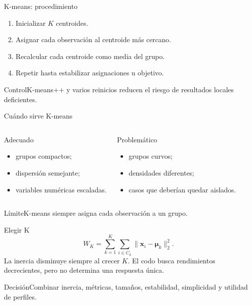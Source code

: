 \documentclass[aspectratio=169,10pt]{beamer}
\begin{document}
\begin{frame}{K-means: procedimiento}\small
\begin{enumerate}\item Inicializar $K$ centroides.\item Asignar cada observación al centroide más cercano.\item Recalcular cada centroide como media del grupo.\item Repetir hasta estabilizar asignaciones u objetivo.\end{enumerate}
\begin{block}{Control}K-means++ y varios reinicios reducen el riesgo de resultados locales deficientes.\end{block}
\end{frame}

\begin{frame}{Cuándo sirve K-means}\small
\begin{columns}[T]\begin{block}{Adecuado}\begin{itemize}\item grupos compactos;\item dispersión semejante;\item variables numéricas escaladas.\end{itemize}\end{block}\begin{alertblock}{Problemático}\begin{itemize}\item grupos curvos;\item densidades diferentes;\item casos que deberían quedar aislados.\end{itemize}\end{alertblock}\end{columns}
\begin{block}{Límite}K-means siempre asigna cada observación a un grupo.\end{block}
\end{frame}

\begin{frame}{Elegir K}\small
\[W_K=\sum_{k=1}^{K}\sum_{i\in C_k}\|\mathbf{x}_i-\boldsymbol{\mu}_k\|_2^2.\]
La inercia disminuye siempre al crecer $K$. El codo busca rendimientos decrecientes, pero no determina una respuesta única.
\begin{block}{Decisión}Combinar inercia, métricas, tamaños, estabilidad, simplicidad y utilidad de perfiles.\end{block}
\end{frame}
\end{document}

